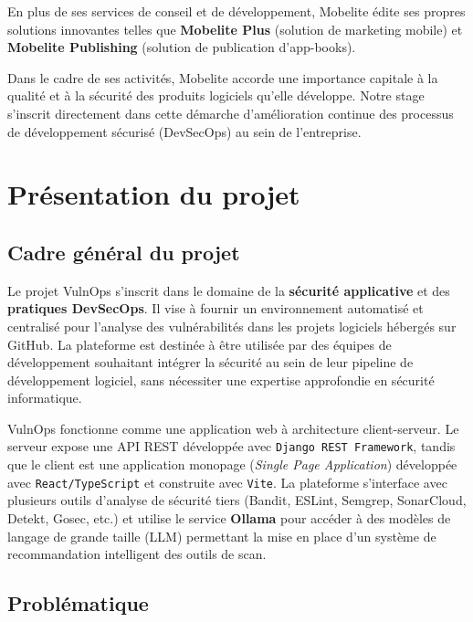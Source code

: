 \documentclass[12pt, a4paper, oneside]{report}
\begin{document}
En plus de ses services de conseil et de développement, Mobelite édite ses propres solutions innovantes telles que \textbf{Mobelite Plus} (solution de marketing mobile) et \textbf{Mobelite Publishing} (solution de publication d'app-books). 

Dans le cadre de ses activités, Mobelite accorde une importance capitale à la qualité et à la sécurité des produits logiciels qu'elle développe. Notre stage s'inscrit directement dans cette démarche d'amélioration continue des processus de développement sécurisé (DevSecOps) au sein de l'entreprise.

\section{Présentation du projet}
\label{sec:projet}

\subsection{Cadre général du projet}
\label{subsec:cadre}

Le projet VulnOps s'inscrit dans le domaine de la \textbf{sécurité applicative}
et des \textbf{pratiques DevSecOps}. Il vise à fournir un environnement automatisé
et centralisé pour l'analyse des vulnérabilités dans les projets logiciels hébergés
sur GitHub. La plateforme est destinée à être utilisée par des équipes de développement
souhaitant intégrer la sécurité au sein de leur pipeline de développement logiciel,
sans nécessiter une expertise approfondie en sécurité informatique.

VulnOps fonctionne comme une application web à architecture client-serveur.
Le serveur expose une API REST développée avec \texttt{Django REST Framework},
tandis que le client est une application monopage (\textit{Single Page Application})
développée avec \texttt{React/TypeScript} et construite avec \texttt{Vite}.
La plateforme s'interface avec plusieurs outils d'analyse de sécurité tiers
(Bandit, ESLint, Semgrep, SonarCloud, Detekt, Gosec, etc.)
et utilise le service \textbf{Ollama} pour accéder à des modèles de langage de grande taille (LLM) permettant la mise en place d’un système de recommandation intelligent des outils de scan.
\subsection{Problématique}
\label{subsec:problematique}
\end{document}
